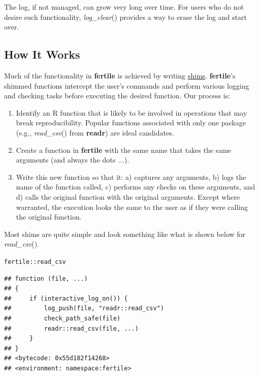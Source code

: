 \documentclass[APA,LATO1COL]{WileyNJD-v2}\usepackage[]{graphicx}\usepackage[]{color}
\makeatletter
\newcommand{\hlopt}[1]{\textcolor[rgb]{0,0,0}{#1}}%
\newcommand{\hlstd}[1]{\textcolor[rgb]{0.345,0.345,0.345}{#1}}%
\newenvironment{kframe}{%
 \def\at@end@of@kframe{}%
 \ifinner\ifhmode%
  \def\at@end@of@kframe{\end{minipage}}%
  \begin{minipage}{\columnwidth}%
 \fi\fi%
 \def\FrameCommand##1{\hskip\@totalleftmargin \hskip-\fboxsep
 \colorbox{shadecolor}{##1}\hskip-\fboxsep
     \hskip-\linewidth \hskip-\@totalleftmargin \hskip\columnwidth}%
 \MakeFramed {\advance\hsize-\width
   \@totalleftmargin\z@ \linewidth\hsize
   \@setminipage}}%
 {\par\unskip\endMakeFramed%
 \at@end@of@kframe}
\newenvironment{knitrout}{}{} %
\newcommand{\R}{\textsf{R}\xspace}
\newcommand{\cmd}[1]{\textit{#1}}
\newcommand{\pkg}[1]{\textbf{#1}}
\newcommand{\func}[1]{\textit{#1}()}
\makeatother
\begin{document}
The log, if not managed, can grow very long over time. For users who do not desire such functionality, \func{log\_clear} provides a way to erase the log and start over.




\subsection{How It Works}

Much of the functionality in \pkg{fertile} is achieved by writing \href{https://en.wikipedia.org/wiki/Shim_(computing)}{shims}. \pkg{fertile}'s shimmed functions intercept the user's commands and perform various logging and checking tasks before executing the desired function. Our process is:

\begin{enumerate}[noitemsep]
\item Identify an \R function that is likely to be involved in operations that may break reproducibility. Popular functions associated with only one package (e.g., \func{read\_csv} from \pkg{readr}) are ideal candidates.
\item Create a function in \pkg{fertile} with the same name that takes the same arguments (and always the dots \cmd{...}).
\item Write this new function so that it: a) captures any arguments, b) logs the name of the function called, c) performs any checks on these arguments, and d) calls the original function with the original arguments. Except where warranted, the execution looks the same to the user as if they were calling the original function.
\end{enumerate}
Most shims are quite simple and look something like what is shown below for \func{read\_csv}. 

\begin{knitrout}
\color{fgcolor}\begin{kframe}
\begin{alltt}
\hlstd{fertile}\hlopt{::}\hlstd{read_csv}
\end{alltt}
\begin{verbatim}
## function (file, ...) 
## {
##     if (interactive_log_on()) {
##         log_push(file, "readr::read_csv")
##         check_path_safe(file)
##         readr::read_csv(file, ...)
##     }
## }
## <bytecode: 0x55d182f14268>
## <environment: namespace:fertile>
\end{verbatim}
\end{kframe}
\end{knitrout}
\end{document}
